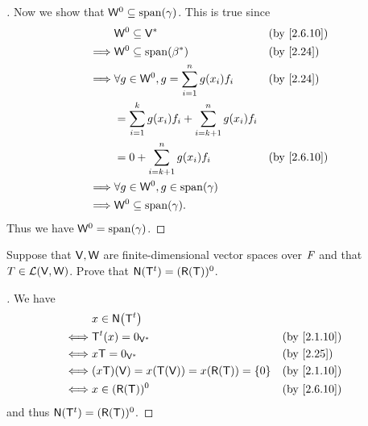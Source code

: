 \begin{proof}[]
  Now we show that \(\W^0 \subseteq \spn{\gamma}\).
  This is true since
  \begin{align*}
             & \W^0 \subseteq \V^*                                         &  & \text{(by \cref{2.6.10})} \\
    \implies & \W^0 \subseteq \spn{\beta^*}                                &  & \text{(by \cref{2.24})}   \\
    \implies & \forall g \in \W^0, g = \sum_{i = 1}^n g(x_i) f_i           &  & \text{(by \cref{2.24})}   \\
             & = \sum_{i = 1}^k g(x_i) f_i + \sum_{i = k + 1}^n g(x_i) f_i                                \\
             & = 0 + \sum_{i = k + 1}^n g(x_i) f_i                         &  & \text{(by \cref{2.6.10})} \\
    \implies & \forall g \in \W^0, g \in \spn{\gamma}                                                     \\
    \implies & \W^0 \subseteq \spn{\gamma}.
  \end{align*}
  Thus we have \(\W^0 = \spn{\gamma}\).
\end{proof}

\begin{ex}\label{ex:2.6.15}
  Suppose that \(\mathsf{V}, \mathsf{W}\) are finite-dimensional vector spaces over \(\mathit{F}\) and that \(T \in \mathcal{L}(\mathsf{V}, \mathsf{W})\).
  Prove that \(\ns{\tp{\T}} = (\rg{\T})^0\).
\end{ex}

\begin{proof}[]
  We have
  \begin{align*}
         & x \in \ns{\tp{\T}}                                                           \\
    \iff & \tp{\T}(x) = 0_{\V^*}                         &  & \text{(by \cref{2.1.10})} \\
    \iff & x \T = 0_{\V^*}                               &  & \text{(by \cref{2.25})}   \\
    \iff & (x \T)(\V) = x(\T(\V)) = x(\rg{\T}) = \set{0} &  & \text{(by \cref{2.1.10})} \\
    \iff & x \in (\rg{\T})^0                             &  & \text{(by \cref{2.6.10})}
  \end{align*}
  and thus \(\ns{\tp{\T}} = (\rg{\T})^0\).
\end{proof}

